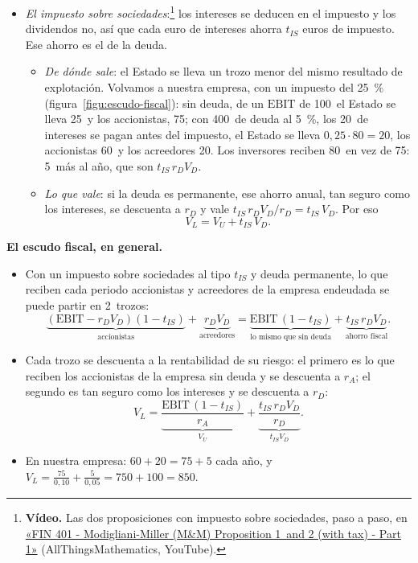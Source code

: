 \documentclass[11pt]{article}
\begin{document}
\begin{itemize}
\item \emph{El impuesto sobre sociedades}\nocite{ModiglianiMiller1963Corporate}:\footnote{\textbf{Vídeo.} Las dos proposiciones con impuesto sobre sociedades, paso a paso, en \href{https://www.youtube.com/watch?v=DoLc5CCqd3g}{«FIN 401 - Modigliani-Miller (M\&M) Proposition 1~and 2 (with tax) - Part 1»} (AllThingsMathematics, YouTube).} los intereses se deducen en el impuesto y los dividendos no, así que cada euro de intereses ahorra $t_{IS}$ euros de impuesto. Ese ahorro es el  de la deuda.
  \begin{itemize}
  \item \emph{De dónde sale}: el Estado se lleva un trozo menor del mismo resultado de explotación. Volvamos a nuestra empresa, con un impuesto del 25~\% (figura~\ref{figu:escudo-fiscal}): sin deuda, de un $\mathrm{EBIT}$ de 100~el Estado se lleva 25~y los accionistas, 75; con 400~de deuda al 5~\%, los 20~de intereses se pagan antes del impuesto, el Estado se lleva $0{,}25\cdot80=20$, los accionistas 60~y los acreedores 20. Los inversores reciben 80~en vez de 75: 5~más al año, que son $t_{IS}\,r_DV_D$.
  \item \emph{Lo que vale}: si la deuda es permanente, ese ahorro anual, tan seguro como los intereses, se descuenta a $r_D$ y vale $t_{IS}\,r_DV_D/r_D=t_{IS}\,V_D$. Por eso
    \[
    V_L=V_U+t_{IS}\,V_D.
    \]
  \end{itemize}
\end{itemize}

\begin{infografia}[H]
\centering
\caption{El escudo fiscal de la deuda: cómo se reparte el resultado de explotación de nuestra empresa}\label{figu:escudo-fiscal}
\end{infografia}

\begin{anotaciones}
\textbf{El escudo fiscal, en general.}
\begin{itemize}
\item Con un impuesto sobre sociedades al tipo $t_{IS}$ y deuda permanente, lo que reciben cada periodo accionistas y acreedores de la empresa endeudada se puede partir en 2~trozos:
  \[
  \underbrace{(\mathrm{EBIT}-r_DV_D)(1-t_{IS})}_{\text{accionistas}}+\underbrace{r_DV_D}_{\text{acreedores}}=\underbrace{\mathrm{EBIT}\,(1-t_{IS})}_{\text{lo mismo que sin deuda}}+\underbrace{t_{IS}\,r_DV_D}_{\text{ahorro fiscal}}.
  \]
\item Cada trozo se descuenta a la rentabilidad de su riesgo: el primero es lo que reciben los accionistas de la empresa sin deuda y se descuenta a $r_A$; el segundo es tan seguro como los intereses y se descuenta a $r_D$:
  \[
  V_L=\underbrace{\frac{\mathrm{EBIT}\,(1-t_{IS})}{r_A}}_{V_U}+\underbrace{\frac{t_{IS}\,r_DV_D}{r_D}}_{t_{IS}V_D}.
  \]
\item En nuestra empresa: $60+20=75+5$ cada año, y $V_L=\tfrac{75}{0{,}10}+\tfrac{5}{0{,}05}=750+100=850$.\findemo
\end{itemize}
\end{anotaciones}
\end{document}
